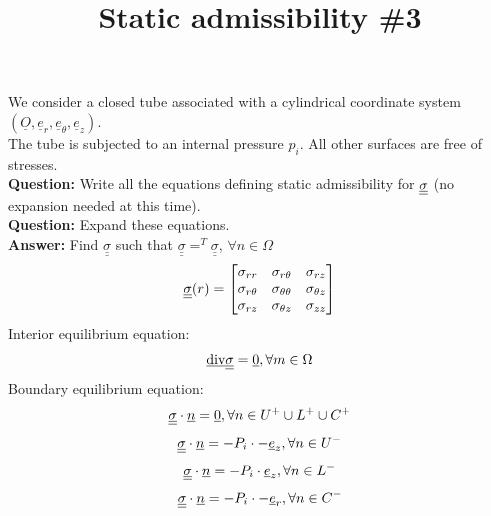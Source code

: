 \documentclass[letter,12pt]{article}
\begin{document}
\pagestyle{fancy}

\title{\textbf{Static admissibility \#3}}
\date{}

\maketitle

\vspace{-1cm}


We consider a closed tube associated with a cylindrical coordinate system $(\underline{O}, \underline{e}_r, \underline{e}_{\theta}, \underline{e}_z)$. \\

The tube is subjected to an internal pressure $p_i$. All other surfaces are free of stresses.\\

\noindent \textbf{Question:} Write all the equations defining static admissibility  for $\underline{\underline{\sigma}}$ (no expansion needed at this time).\\

\noindent \textbf{Question:} Expand these equations. \\
 
 
\noindent \textbf{Answer:} Find $\underline{\underline{\sigma}}$ such that $\underline{\underline{\sigma}} =^T\underline{\underline{\sigma}} $,  $\forall n \in \Omega$ \\
\begin{equation}
\underline{\underline{\sigma}}(r) = \left[
\begin{matrix}
\sigma_{rr} & \sigma_{r\theta} & \sigma_{rz} \\
\sigma_{r\theta} & \sigma_{\theta\theta} & \sigma_{\theta z} \\
\sigma_{rz} & \sigma_{\theta z} & \sigma_{zz} 
\end{matrix}
\right]
\end{equation}
Interior equilibrium equation: 
\begin{equation}
\underline{\text{div}} \underline{\underline{\sigma}} = \underline{0}, \forall m \in \Omega
\end{equation}
Boundary equilibrium equation: 
\begin{equation}
\underline{\underline{\sigma}} \cdot \underline{n} = \underline{0}, \forall n \in U^{+} \cup L^{+} \cup C^{+}
\end{equation}
\begin{equation}
\underline{\underline{\sigma}} \cdot \underline{n} = -P_i \cdot -\underline{e}_{z}, \forall n \in U^{-}
\end{equation}
\begin{equation}
\underline{\underline{\sigma}} \cdot \underline{n} = -P_i \cdot \underline{e}_{z}, \forall n \in L^{-}
\end{equation}
\begin{equation}
\underline{\underline{\sigma}} \cdot \underline{n} = -P_i \cdot -\underline{e}_{r}, \forall n \in C^{-}
\end{equation}
\end{document}
